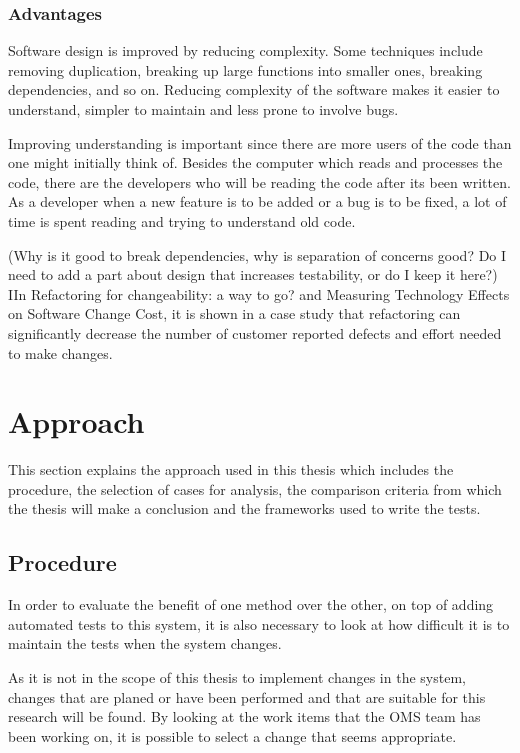 \documentclass{article}
\begin{document}
			\subsubsection{Advantages}
			Software design is improved by reducing complexity. Some techniques include removing
			duplication, breaking up large functions into smaller ones, breaking dependencies, and so on.
			Reducing complexity of the software makes it easier to understand, simpler to maintain and less prone to involve bugs.

			Improving understanding is important since there are more users of the code than one might initially think of. Besides the computer which reads and processes the code, there are the developers who will be reading the code after its been written. As a developer when a new feature is to be added or a bug is to be fixed, a lot of time is spent reading and trying to understand old code.

		(Why is it good to break dependencies, why is separation of concerns good? Do I need to add a part about design that increases testability, or do I keep it here?)
		IIn Refactoring for changeability: a way to go? and Measuring Technology Effects on Software Change Cost, it is shown in a case study that refactoring can significantly decrease the number of customer reported defects and effort needed to make changes.


	\section{Approach}
		This section explains the approach used in this thesis which includes the procedure, the selection of cases for analysis, the comparison criteria from which the thesis will make a conclusion and the frameworks used to write the tests.

		\subsection{Procedure}
		In order to evaluate the benefit of one method over the other, on top of adding automated tests to this system, it is also necessary to look at how difficult it is to maintain the tests when the system changes. 

		As it is not in the scope of this thesis to implement changes in the system, changes that are planed or have been performed and that are suitable for this research will be found. By looking at the work items that the OMS team has been working on, it is possible to select a change that seems appropriate. 
\end{document}
